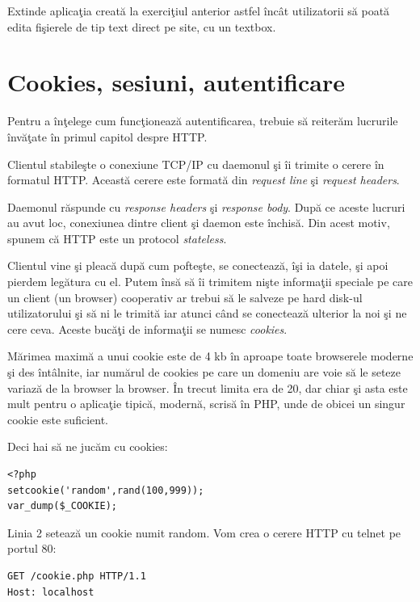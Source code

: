 \begin{Exercise}[title={Remote file storage cu editare text on-site},difficulty=1]
Extinde aplicaţia creată la exerciţiul anterior astfel încât
utilizatorii să poată edita fişierele de tip text direct
pe site, cu un textbox.
\end{Exercise}

\section{Cookies, sesiuni, autentificare}
Pentru a \^inţelege cum funcţionează autentificarea, trebuie să
reiterăm lucrurile \^invăţate \^in primul capitol despre HTTP.

Clientul stabileşte o conexiune TCP/IP cu daemonul şi \^ii
trimite o cerere \^in formatul HTTP. Această cerere
este formată din \textit{request line} şi \textit{request headers}.

Daemonul răspunde cu \textit{response headers} şi \textit{response body}.
După ce aceste lucruri au avut loc, conexiunea dintre client şi daemon
este \^inchisă. Din acest motiv, spunem că HTTP este un protocol \textsl{stateless}.

Clientul vine şi pleacă după cum pofteşte, se conectează, \^işi ia datele,
şi apoi pierdem legătura cu el. Putem \^insă să \^ii trimitem nişte informaţii {\glqq}speciale{\grqq}
pe care un client (un browser) cooperativ ar trebui să le salveze pe hard disk-ul
utilizatorului şi să ni le trimită iar atunci c\^and se conectează ulterior
la noi şi ne cere ceva. Aceste bucăţi de informaţii se numesc \textsl{cookies}.

Mărimea maximă a unui cookie este de 4 kb \^in aproape toate browserele moderne şi
des \^int\^alnite, iar numărul de cookies pe care un domeniu are voie să
le seteze variază de la browser la browser. \^In trecut limita era de
20, dar chiar şi asta este mult pentru o aplicaţie tipică,
modernă, scrisă \^in PHP,
unde de obicei un singur cookie este suficient.

Deci hai să ne jucăm cu cookies:

\begin{lstlisting}[title=Folosirea cookie-urilor]
<?php
setcookie('random',rand(100,999));
var_dump($_COOKIE);
\end{lstlisting}

Linia 2 setează un cookie numit {\glqq}random{\grqq}.
Vom crea o cerere HTTP cu telnet pe portul 80:
\begin{verbatim}
GET /cookie.php HTTP/1.1
Host: localhost

\end{verbatim}

